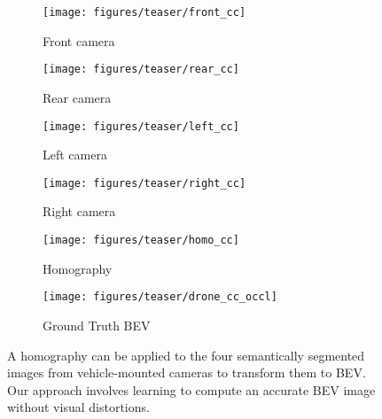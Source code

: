 \documentclass[a4paper, 10pt, conference]{ieeeconf}
\begin{document}
\begin{figure}[t]
  \captionsetup[subfigure]{skip=0pt}
  \begin{subfigure}[t]{0.24\linewidth}
    \captionsetup{belowskip=6pt}
    \caption*{Front camera}
    \texttt{[image: figures/teaser/front\_cc]}
  \end{subfigure}
  \hfill
  \begin{subfigure}[t]{0.24\linewidth}
    \captionsetup{belowskip=6pt}
    \caption*{Rear camera}
    \texttt{[image: figures/teaser/rear\_cc]}
  \end{subfigure}
  \hfill
  \begin{subfigure}[t]{0.24\linewidth}
    \captionsetup{belowskip=6pt}
    \caption*{Left camera}
    \texttt{[image: figures/teaser/left\_cc]}
  \end{subfigure}
  \hfill
  \begin{subfigure}[t]{0.24\linewidth}
    \captionsetup{belowskip=6pt}
    \caption*{Right camera}
    \texttt{[image: figures/teaser/right\_cc]}
  \end{subfigure}

  \vspace{0.25\baselineskip}
  \captionsetup[subfigure]{skip=2pt}
  \begin{subfigure}[b]{0.4925\linewidth}
    \texttt{[image: figures/teaser/homo\_cc]}
    \caption*{Homography}
  \end{subfigure}
  \hfill
  \begin{subfigure}[b]{0.4925\linewidth}
    \texttt{[image: figures/teaser/drone\_cc\_occl]}
    \caption*{Ground Truth BEV}
  \end{subfigure}\caption{A homography can be applied to the four semantically segmented images from vehicle-mounted cameras to transform them to BEV. Our approach involves learning to compute an accurate BEV image without visual distortions.}
  \label{fig:TeaserImage}
\end{figure}
\end{document}

